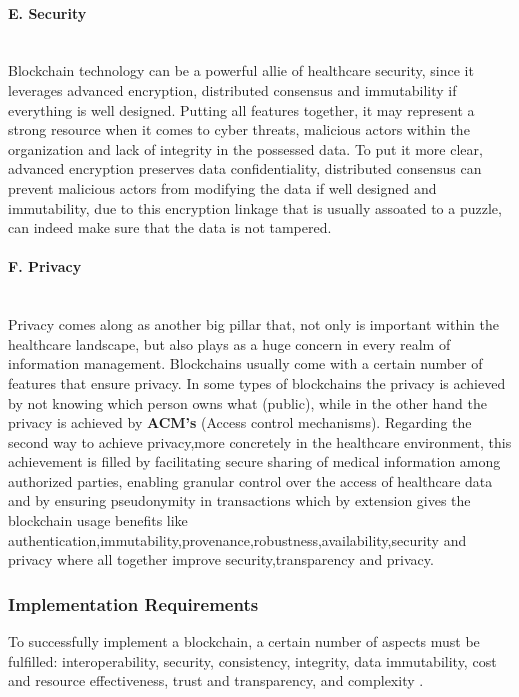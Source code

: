 \paragraph{E. Security} \mbox{}\\
Blockchain technology can be a powerful allie of healthcare security, since it leverages advanced encryption, distributed consensus and immutability if everything is well designed. Putting all features together, it may represent a strong resource when it comes to cyber threats, malicious actors within the organization and lack of integrity in the possessed data. To put it more clear, advanced encryption preserves data confidentiality, distributed consensus can prevent malicious actors from modifying the data if well designed and immutability, due to this encryption linkage that is usually assoated to a puzzle, can indeed make sure that the data is not tampered.

\paragraph{F. Privacy} \mbox{}\\
Privacy comes along as another big pillar that, not only is important within the healthcare landscape, but also plays as a huge concern in every realm of information management. Blockchains usually come with a certain number of features that ensure privacy. In some types of blockchains the privacy is achieved by not knowing which person owns what (public), while in the other hand the privacy is achieved by \textbf{ACM's} (Access control mechanisms). Regarding the second way to achieve privacy,more concretely in the healthcare environment, this achievement is filled by facilitating secure sharing of medical information among authorized parties, enabling granular control over the access of healthcare data and by ensuring pseudonymity in transactions which by extension gives the blockchain usage benefits like authentication,immutability,provenance,robustness,availability,security and privacy where all together improve security,transparency and privacy.

\subsubsection{Implementation Requirements} 
To successfully implement a blockchain, a certain number of aspects must be fulfilled: interoperability, security, consistency, integrity, data immutability, cost and resource effectiveness, trust and transparency, and complexity \cite{blockchain-utilization-in-healthcare}.

